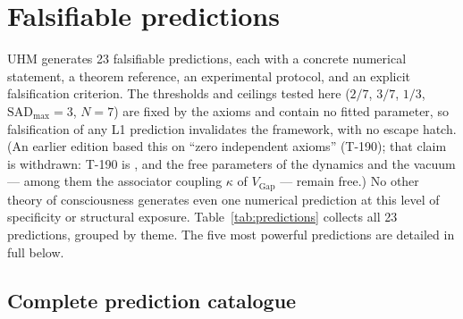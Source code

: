 
\section{Falsifiable predictions}
\label{sec:predictions}

UHM generates 23 falsifiable predictions, each with a concrete numerical
statement, a theorem reference, an experimental protocol, and an explicit
falsification criterion. The thresholds and ceilings tested here
($2/7$, $3/7$, $1/3$, $\mathrm{SAD}_{\max} = 3$, $N = 7$) are fixed by the
axioms and contain no fitted parameter, so falsification of any L1 prediction
invalidates the framework, with no escape hatch. (An earlier edition based
this on ``zero independent axioms'' (T-190); that claim is withdrawn: T-190 is
, and the
free parameters of the dynamics and the vacuum --- among them the associator
coupling $\kappa$ of $V_{\mathrm{Gap}}$ --- remain free.)
No other theory of consciousness generates even one numerical prediction at
this level of specificity or structural exposure.
Table~\ref{tab:predictions} collects all 23 predictions, grouped by theme.
The five most powerful predictions are detailed in full below.

\subsection{Complete prediction catalogue}

